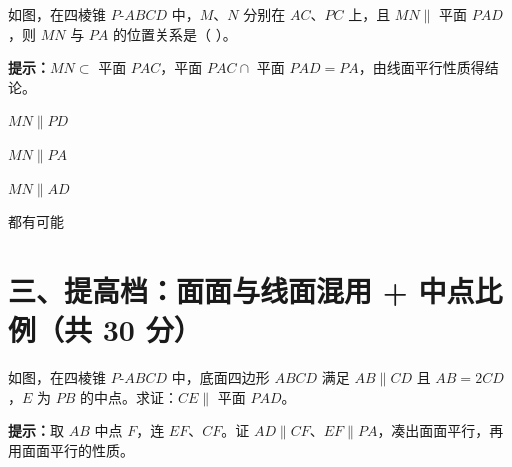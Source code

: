 \documentclass{exam-zh}
\begin{document}
\begin{question}[points=10]
  \noindent
  \begin{minipage}[t]{\dimexpr\linewidth-60mm-6mm\relax}
    \vspace{0pt}
    如图，在四棱锥 $P$-$ABCD$ 中，$M$、$N$ 分别在 $AC$、$PC$ 上，且 $MN\parallel$ 平面 $PAD$，则 $MN$ 与 $PA$ 的位置关系是（    ）。
    \begin{hintbox}
\textbf{提示：}$MN\subset$ 平面 $PAC$，平面 $PAC\cap$ 平面 $PAD=PA$，由线面平行性质得结论。\end{hintbox}

    \par
    \begin{choices}[columns=1]
      \item $MN\parallel PD$
      \item $MN\parallel PA$
      \item $MN\parallel AD$
      \item 都有可能
    \end{choices}
  \end{minipage}\hfill
  \begin{diagramcoltikz}{60mm}{找到含 $MN$ 的辅助面与平面 $PAD$ 的交线。}
  }
  \end{diagramcoltikz}
\end{question}



\clearpage
\section*{三、提高档：面面与线面混用 + 中点比例（共 30 分）}


\begin{problem}[points=10]
  \noindent
  \begin{minipage}[t]{\dimexpr\linewidth-60mm-6mm\relax}
    \vspace{0pt}
    如图，在四棱锥 $P$-$ABCD$ 中，底面四边形 $ABCD$ 满足 $AB\parallel CD$ 且 $AB=2CD$，$E$ 为 $PB$ 的中点。求证：$CE\parallel$ 平面 $PAD$。

    \begin{hintbox}
\textbf{提示：}取 $AB$ 中点 $F$，连 $EF$、$CF$。证 $AD\parallel CF$、$EF\parallel PA$，凑出面面平行，再用面面平行的性质。\end{hintbox}

  \end{minipage}\hfill
  \begin{diagramcoltikz}{60mm}{取 $F$ 为 $AB$ 中点，证面 $PAD\parallel$ 面 $CEF$，再用其他性质。}
  }
  \end{diagramcoltikz}
  \par\medskip
  \answerarea[75mm]
\end{problem}
\end{document}

